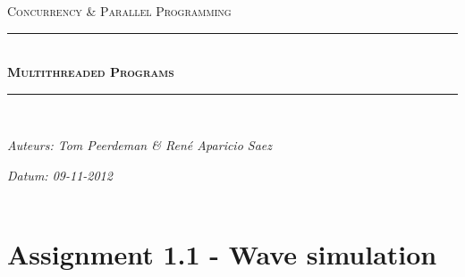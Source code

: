 \documentclass[a4paper]{article}
\newcommand{\HRule}{\rule{\linewidth}{0.5mm}}
\begin{document}
	\begin{titlepage}
	\begin{center}
		\textsc{\Large Concurrency \& Parallel Programming}\\[0.5cm]
		\HRule \\[0,4cm]
		\textsc{\huge \bfseries Multithreaded Programs}
		\HRule \\[8cm]
		\begin{minipage}{0.4\textwidth}
			\begin{flushleft}\large
				\emph{Auteurs: Tom Peerdeman \& Ren\'e Aparicio Saez}\\
			\end{flushleft}
		\end{minipage}
		\begin{minipage}{0.4\textwidth}
			\begin{flushright}\large
			\emph{Datum: 09-11-2012\\\hspace{1cm}}\\
			\end{flushright}
		\end{minipage}
	\end{center}
	\end{titlepage}

  \section{Assignment 1.1 - Wave simulation}
\end{document}
